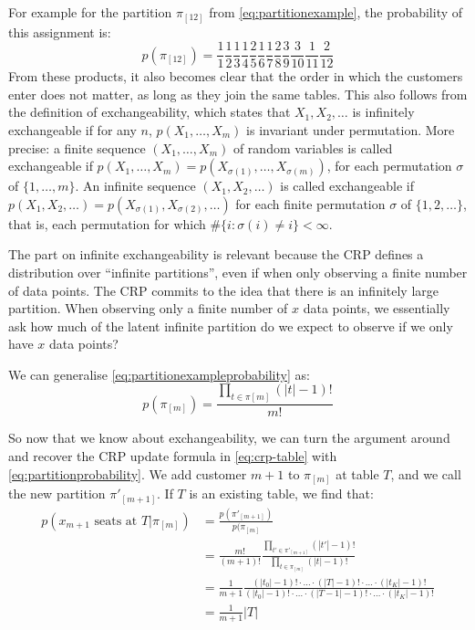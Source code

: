 For example for the partition $\pi_{[12]}$ from \cref{eq:partitionexample}, the probability of this assignment is:
\begin{equation}\label{eq:partitionexampleprobability}
	p(\pi_{[12]}) = \frac{1}{1}\frac{1}{2}\frac{1}{3}\frac{1}{4}\frac{2}{5}\frac{1}{6}\frac{1}{7}\frac{2}{8}\frac{3}{9}\frac{3}{10}\frac{1}{11}\frac{2}{12}
\end{equation}
From these products, it also becomes clear that the order in which the customers enter does not matter, as long as they join the same tables. This also follows from the definition of exchangeability, which states that $X_1, X_2, \ldots$ is infinitely exchangeable if for any $n$, $p(X_1,\ldots,X_m)$ is invariant under permutation. More precise: a finite sequence $(X_1, \ldots, X_m)$ of random variables is called exchangeable if $p(X_1,\ldots,X_m) = p(X_{\sigma(1)},\ldots,X_{\sigma(m)})$, for each permutation $\sigma$ of $\{1,\ldots,m\}$. An infinite sequence $(X_1,X_2,\ldots)$ is called exchangeable if $p(X_1,X_2,\ldots)=p(X_{\sigma(1)},X_{\sigma(2)},\ldots)$ for each finite permutation $\sigma$ of $\{1,2,\ldots\}$, that is, each permutation for which $\#\{i: \sigma(i)\neq i\} < \infty$.

The part on infinite exchangeability is relevant because the CRP defines a distribution over ``infinite partitions'', even if when only observing a finite number of data points. The CRP commits to the idea that there is an infinitely large partition. When observing only a finite number of $x$ data points, we essentially ask how much of the latent infinite partition do we expect to observe if we only have $x$ data points?

We can generalise \cref{eq:partitionexampleprobability} as:
\begin{equation}\label{eq:partitionprobability}
	p(\pi_{[m]}) = \frac{\prod_{t\in\pi{[m]}} (|t|-1)!}{m!}
\end{equation}

So now that we know about exchangeability, we can turn the argument around and recover the CRP update formula in \cref{eq:crp-table} with \cref{eq:partitionprobability}. We add customer $m+1$ to $\pi_{[m]}$ at table $T$, and we call the new partition $\pi'_{[m+1]}$. If $T$ is an existing table, we find that:
\begin{equation}
\begin{split}
	p(x_{m+1}\text{ seats at }T|\pi_{[m]}) &= \frac{p(\pi'_{[m+1]})}{p(\pi_{[m]}} \\
     &= \frac{m!}{(m+1)!}\frac{\prod_{t'\in\pi'_{[m+1]}}(|t'|-1)!}{\prod_{t\in\pi_{[m]}}(|t|-1)!} \\
     &= \frac{1}{m+1}\frac{(|t_0|-1)! \cdot \ldots \cdot (|T|-1)! \cdot\ldots\cdot (|t_K|-1)!}{(|t_0|-1)! \cdot \ldots \cdot (|T-1|-1)! \cdot\ldots\cdot (|t_K|-1)!} \\
     &= \frac{1}{m+1}|T|
\end{split}
\end{equation}

